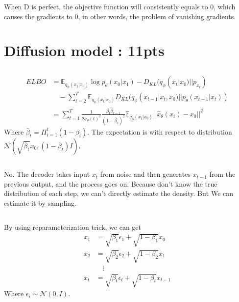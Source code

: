 \documentclass[12pt]{article}
\begin{document}
\subsection{}
When D is perfect, the objective function will consistently equals to 0, which causes the gradients to 0, in other words, the problem of vanishing gradients.

\newpage

\section{Diffusion model : 11pts}
\subsection{}
\begin{align}
    ELBO &= \mathbb{E}_{q_\phi(x_1|x_0)}\log p_\theta(x_0|x_1) - D_{KL}(q_\phi(x_t|x_0) || p_{x_t}) \nonumber \\
    & \quad - \sum_{t=2}^{T}\mathbb{E}_{q_\phi(x_t|x_0)} D_{KL}(q_\phi(x_{t-1}|x_t, x_0) || p_\theta(x_{t-1} | x_t)) \nonumber \\
    & = \sum_{t=1}^{T}\frac{1}{2\sigma_q(t)^2}\frac{\beta_t \bar{\beta}_{t-1}}{(1 - \bar{\beta}_t)^2} \mathbb{E}_{q_\phi(x_t | x_0)} || \hat{x}_\theta(x_t) - x_0 ||^2 \nonumber
\end{align}
Where $\bar{\beta}_t = \Pi_{i=1}^{t}(1-\beta_i)$.
The expectation is with respect to distribution $\mathcal{N}(\sqrt{\bar{\beta}_{t}}x_0, (1 - \bar{\beta}_t)I)$.
\subsection{}
No. The decoder takes input $x_t$ from noise and then generates $x_{t-1}$ from the previous output, and the process goes on. Because don't know the true distribution of each step, we can't directly estimate the density.
But We can estimate it by sampling.

\subsection{}
By using reparameterization trick, we can get 
\begin{align}
    x_1 &= \sqrt{\beta_1}\epsilon_1 + \sqrt{1-\beta_1}x_0 \nonumber \\
    x_2 &= \sqrt{\beta_2}\epsilon_2 + \sqrt{1-\beta_2}x_1 \nonumber \\
    &\quad \vdots \nonumber \\
    x_t &= \sqrt{\beta_t}\epsilon_t + \sqrt{1-\beta_t}x_{t-1} \nonumber
\end{align} Where $\epsilon_i \sim \mathcal{N}(0, I)$.
\end{document}

